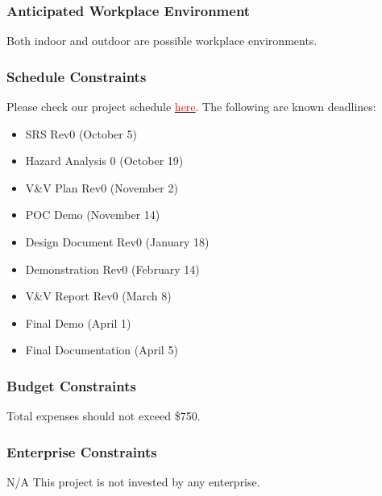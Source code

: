 \documentclass{article}
\begin{document}
\subsubsection{Anticipated Workplace Environment}
Both indoor and outdoor are possible workplace environments. 

\subsubsection{Schedule Constraints}
Please check our project schedule \href{https://github.com/wuj187/DigitalTwinCAS/tree/main/docs/DevelopmentPlan/Project_Schedule}{\textcolor{red}{here}}. The following are known
deadlines:
\begin{itemize}
\item SRS Rev0 (October 5)
\item Hazard Analysis 0 (October 19)
\item V\&V Plan Rev0 (November 2)
\item POC Demo (November 14)
\item Design Document Rev0 (January 18)
\item Demonstration Rev0 (February 14)
\item V\&V Report Rev0  (March 8)
\item Final Demo (April 1)
\item Final Documentation (April 5)
\end{itemize}

\subsubsection{Budget Constraints}
Total expenses should not exceed \$750.

\subsubsection{Enterprise Constraints}
N/A This project is not invested by any enterprise.
\end{document}
